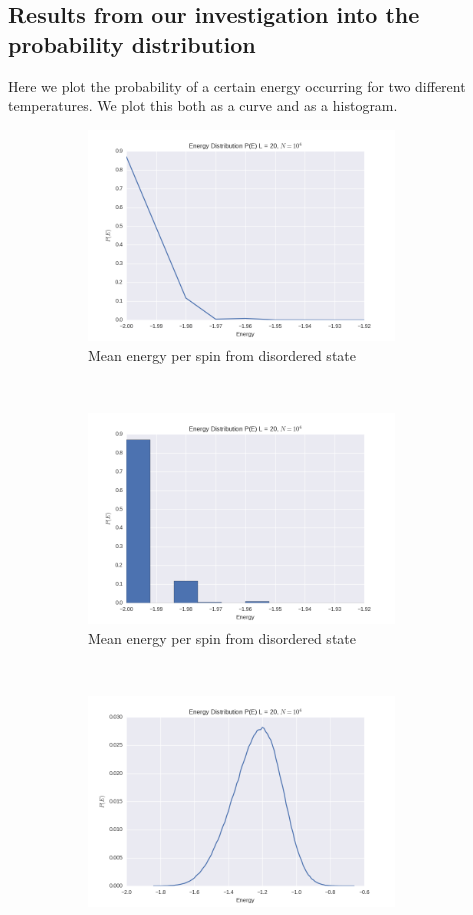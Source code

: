 \documentclass[a4paper, 10pt]{article}
\begin{document}
\subsection{Results from our investigation into the probability distribution}
Here we plot the probability of a certain energy occurring for two different temperatures. We plot this both as a curve and as a histogram.
\begin{figure}[!ht]
    \centering
    \begin{subfigure}[H!]{0.5\textwidth}
        \centering
        \includegraphics[height=2.2in]{energyDistT1.png}
        \caption{Mean energy per spin from disordered state}
    \end{subfigure}%
    ~ 
    \begin{subfigure}[H!]{0.5\textwidth}
        \centering
        \includegraphics[height=2.2in]{energyDistHistoT1.png}
        \caption{Mean energy per spin from disordered state}
    \end{subfigure}
        ~
  \begin{subfigure}[H!]{0.5\textwidth}
        \centering
        \includegraphics[height=2.2in]{energyDist.png}

\end{subfigure}
\end{figure}
\end{document}
